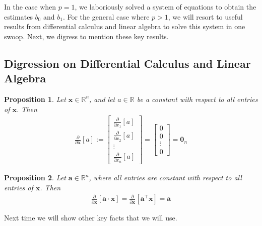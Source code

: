 \documentclass[12pt, a4paper]{article}
\newtheorem{proposition}{Proposition}
\theoremstyle{definition}
\begin{document}
	In the case when $p=1$, we laboriously solved a system of equations to obtain the estimates
	$b_0$ and $b_1$. For the general case where $p>1$, we will resort to useful
	results from differential calculus and linear algebra to solve this system in one swoop.
	Next, we digress to mention these key results.
	\subsection*{Digression on Differential Calculus and Linear Algebra}
	\begin{proposition}
		Let $\mathbf{x}\in\mathbb{R}^n$, and let $a\in\mathbb{R}$ be a constant with
		respect to all entries of $\mathbf{x}$. Then
		\begin{align*}
			\frac{\partial}{\partial\mathbf{x}}[a] := \begin{bmatrix}
				\frac{\partial}{\partial x_1}[a]\\
				\frac{\partial}{\partial x_2}[a]\\
				\vdots\\
				\frac{\partial}{\partial x_n}[a]
			\end{bmatrix}
			=\begin{bmatrix}
				0\\
				0\\
				\vdots\\
				0
			\end{bmatrix}
			=\mathbf{0}_{n}
		\end{align*}
	\end{proposition}
	\begin{proposition}
		Let $\mathbf{a}\in\mathbb{R}^n$, where all entries are constant with respect to
		all entries of $\mathbf{x}$. Then
		\begin{align*}
			\frac{\partial}{\partial\mathbf{x}}[\mathbf{a}\cdot \mathbf{x}]=
			\frac{\partial}{\partial \mathbf{x}}[\mathbf{a}^\top \mathbf{x}]=\mathbf{a}
		\end{align*}
	\end{proposition}
	Next time we will show other key facts that we will use.
\end{document}
